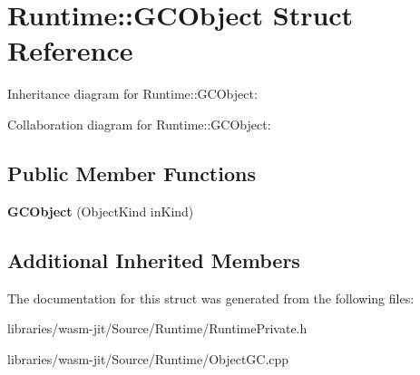 \hypertarget{struct_runtime_1_1_g_c_object}{}\section{Runtime\+:\+:G\+C\+Object Struct Reference}
\label{struct_runtime_1_1_g_c_object}


Inheritance diagram for Runtime\+:\+:G\+C\+Object\+:


Collaboration diagram for Runtime\+:\+:G\+C\+Object\+:
\subsection*{Public Member Functions}
\begin{DoxyCompactItemize}
\item 
\mbox{\label{struct_runtime_1_1_g_c_object_ad61fa15a80d09b18aa1e8f80b1338467}} 
{\bfseries G\+C\+Object} (Object\+Kind in\+Kind)
\end{DoxyCompactItemize}
\subsection*{Additional Inherited Members}


The documentation for this struct was generated from the following files\+:\begin{DoxyCompactItemize}
\item 
libraries/wasm-\/jit/\+Source/\+Runtime/Runtime\+Private.\+h\item 
libraries/wasm-\/jit/\+Source/\+Runtime/Object\+G\+C.\+cpp\end{DoxyCompactItemize}
